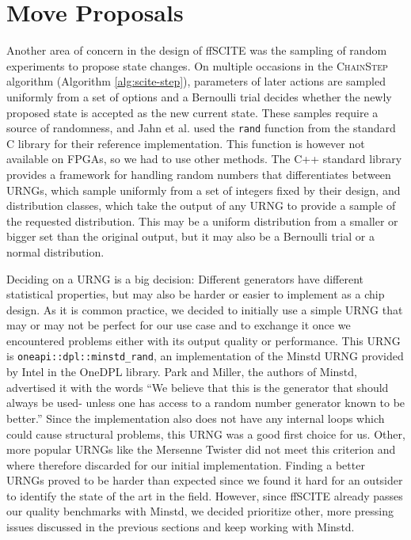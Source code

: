 \section{Move Proposals}
\label{sec:move_proposal}

Another area of concern in the design of \ac{ffSCITE} was the sampling of random experiments to propose state changes. On multiple occasions in the \textsc{ChainStep} algorithm (Algorithm \ref{alg:scite-step}), parameters of later actions are sampled uniformly from a set of options and a Bernoulli trial decides whether the newly proposed state is accepted as the new current state. These samples require a source of randomness, and Jahn et al. \cite{tree2016} used the \texttt{rand} function from the standard C library for their reference implementation. This function is however not available on \acp{FPGA}, so we had to use other methods. The C++ standard library provides a framework for handling random numbers that differentiates between \acp{URNG}, which sample uniformly from a set of integers fixed by their design, and distribution classes, which take the output of any \ac{URNG} to provide a sample of the requested distribution. This may be a uniform distribution from a smaller or bigger set than the original output, but it may also be a Bernoulli trial or a normal distribution. 

Deciding on a \ac{URNG} is a big decision: Different generators have different statistical properties, but may also be harder or easier to implement as a chip design. As it is common practice, we decided to initially use a simple \ac{URNG} that may or may not be perfect for our use case and to exchange it once we encountered problems either with its output quality or performance. This \ac{URNG} is \texttt{oneapi::dpl::minstd\_rand}, an implementation of the Minstd \ac{URNG} \cite{park1988random} provided by Intel in the OneDPL library. Park and Miller, the authors of Minstd, advertised it with the words ``We believe that this is the generator that should always be used- unless one has access to a random number generator known to be better.'' \cite{park1988random} Since the implementation also does not have any internal loops which could cause structural problems, this \ac{URNG} was a good first choice for us. Other, more popular \acp{URNG} like the Mersenne Twister \cite{matsumoto1998mersenne} did not meet this criterion and where therefore discarded for our initial implementation. Finding a better \acp{URNG} proved to be harder than expected since we found it hard for an outsider to identify the state of the art in the field. However, since \ac{ffSCITE} already passes our quality benchmarks with Minstd, we decided prioritize other, more pressing issues discussed in the previous sections and keep working with Minstd.

